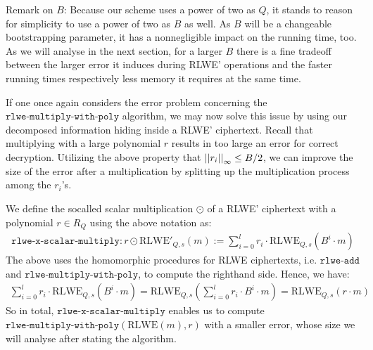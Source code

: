 \documentclass[letterpaper,10pt,english]{jupyterBook}
\begin{document}
\sphinxAtStartPar
Remark on \(B\):
Because our scheme uses a power of two as \(Q\), it stands to reason for simplicity to use a power of two as \(B\) as well.
As \(B\) will be a changeable bootstrapping parameter, it has a non\sphinxhyphen{}negligible impact on the running time, too.
As we will analyse in the next section, for a larger \(B\) there is a fine trade\sphinxhyphen{}off between the larger error it induces during RLWE’ operations and the faster running times respectively less memory it requires at the same time.

\begin{DUlineblock}{0em}
\item[] 
\end{DUlineblock}

\sphinxAtStartPar
If one once again considers the error problem concerning the \(\texttt{rlwe-multiply-with-poly}\) algorithm, we may now solve this issue by using our decomposed information hiding inside a RLWE’ ciphertext.
Recall that multiplying with a large polynomial \(r\) results in too large an error for correct decryption.
Utilizing the above property that \(\left\lvert\left\lvert r_i \right\rvert\right\rvert_\infty \le B/2\), we can improve the size of the error after a multiplication by splitting up the multiplication process among the \(r_i\)’s.

\sphinxAtStartPar
We define the so\sphinxhyphen{}called scalar multiplication \(\odot\) of a RLWE’ ciphertext with a polynomial \(r \in R_Q\) using the above notation as:
\begin{equation*}
\begin{split}\texttt{rlwe-x-scalar-multiply}: r \odot \mathrm{RLWE'}_{Q,s}(m) := \sum_{i=0}^l r_i \cdot \mathrm{RLWE}_{Q,s}(B^i \cdot m)\end{split}
\end{equation*}
\sphinxAtStartPar
The above uses the homomorphic procedures for RLWE ciphertexts, i.e. \(\texttt{rlwe-add}\) and \(\texttt{rlwe-multiply-with-poly}\), to compute the right\sphinxhyphen{}hand side.
Hence, we have:
\begin{equation*}
\begin{split}\sum_{i=0}^l r_i \cdot \mathrm{RLWE}_{Q,s}(B^i \cdot m) = \mathrm{RLWE}_{Q,s} \left( \sum_{i=0}^l r_i \cdot B^i \cdot m \right) = \mathrm{RLWE}_{Q,s}(r\cdot m)\end{split}
\end{equation*}
\sphinxAtStartPar
So in total, \(\texttt{rlwe-x-scalar-multiply}\) enables us to compute \(\texttt{rlwe-multiply-with-poly}(\mathrm{RLWE}(m), r)\) with a smaller error, whose size we will analyse after stating the algorithm.
\end{document}
